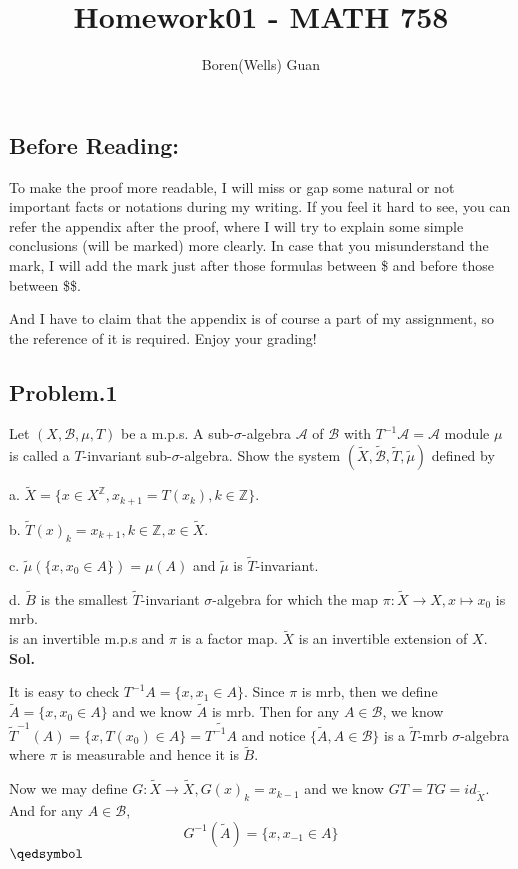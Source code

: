 \documentclass[lang=en,11pt,a4paper,citestyle =authoryear]{elegantpaper}
\title{Homework01 - MATH 758}
\author{Boren(Wells) Guan}
\newcommand{\prvd}{$\hfill \qedsymbol$}
\newcommand{\Z}{\mathbb{Z}}
\begin{document}
\maketitle

\subsection*{Before Reading:}\par
To make the proof more readable, I will miss or gap some natural or not important facts or notations during my writing. If you feel it hard to see, you can refer the appendix after the proof, where I will try to explain some simple conclusions (will be marked) more clearly. In case that you misunderstand the mark, I will add the mark just after those formulas between \$ and before those between \$\$.\par
And I have to claim that the appendix is of course a part of my assignment, so the reference of it is required. Enjoy your grading!

\subsection*{Problem.1} 
Let $(X,\mathcal{B},\mu,T)$ be a m.p.s. A sub-$\sigma$-algebra $\mathcal{A}$ of $\mathcal{B}$ with $T^{-1}\mathcal{A} = \mathcal{A}$ module $\mu$ is called a $T$-invariant sub-$\sigma$-algebra. Show the system $(\tilde{X},\tilde{\mathcal{B}},\tilde{T},\tilde{\mu})$ defined by\par
a. $\tilde{X} = \{x\in X^{\Z}, x_{k+1} = T(x_k), k\in\Z\}$.\par
b. $\tilde{T}(x)_k = x_{k+1}, k\in\Z,x\in\tilde{X}$.\par
c. $\tilde{\mu}(\{x,x_0 \in A\}) = \mu(A)$ and $\tilde{\mu}$ is $\tilde{T}$-invariant.\par
d. $\tilde{B}$ is the smallest $\tilde{T}$-invariant $\sigma$-algebra for which the map $\pi:\tilde{X}\to X, x\mapsto x_0$ is mrb.\\
is an invertible m.p.s and $\pi$ is a factor map. $\tilde{X}$ is an invertible extension of $X$.
\vspace{0.5em}\\
\textbf{Sol.} \par
It is easy to check $T^{-1}A = \{x, x_1 \in A\}$. Since $\pi$ is mrb, then we define $\tilde{A} = \{x,x_0\in A\}$ and we know $\tilde{A}$ is mrb. Then for any $A \in \mathcal{B}$, we know $\tilde{T}^{-1}(A) = \{x,T(x_0)\in A\} = \tilde{T^{-1}A}$ and notice $\{\tilde{A}, A\in\mathcal{B}\}$ is a $\tilde{T}$-mrb $\sigma$-algebra where $\pi$ is measurable and hence it is $\tilde{B}$.\par
Now we may define $G:\tilde{X} \to \tilde{X}, G(x)_k = x_{k-1}$ and we know $GT = TG = id_{\tilde{X}}$. And for any $A\in \mathcal{B}$,
\[G^{-1}(\tilde{A}) = \{x, x_{-1} \in A\}\]
\prvd
\vspace{0.5em}
\end{document}
